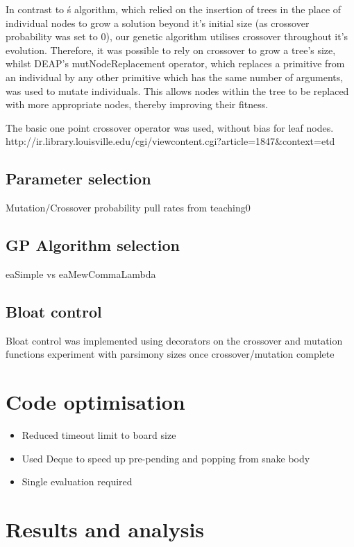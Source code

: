 \documentclass[british,10pt,a4paper]{article}
\begin{document}
In contrast to \citeauthor{Ehlis2000-sz}\'s algorithm, which relied on the insertion of trees in the place of individual nodes to grow a solution beyond it's initial size (as crossover probability was set to 0), our genetic algorithm utilises crossover throughout it's evolution. Therefore, it was possible to rely on crossover to grow a tree's size, whilst DEAP's mutNodeReplacement operator, which replaces a primitive from an individual by any other primitive which has the same number of arguments, was used to mutate individuals. This allows nodes within the tree to be replaced with more appropriate nodes, thereby improving their fitness. \newline

The basic one point crossover operator was used, without bias for leaf nodes. \newline
http://ir.library.louisville.edu/cgi/viewcontent.cgi?article=1847&context=etd
\subsection{Parameter selection}
Mutation/Crossover probability
\TODO pull rates from teaching0

\subsection{GP Algorithm selection}
eaSimple vs eaMewCommaLambda
\subsection{Bloat control}
Bloat control was implemented using decorators on the crossover and mutation functions
\TODO experiment with parsimony sizes once crossover/mutation complete

\section{Code optimisation}
\begin{itemize}
	\item Reduced timeout limit to board size
	\item Used Deque to speed up pre-pending and popping from snake body
	\item Single evaluation required 
\end{itemize}
\section{Results and analysis}
\end{document}
